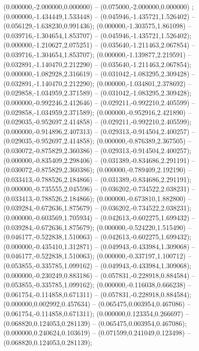  (0.000000,-2.000000,0.000000) -- (0.075000,-2.000000,0.000000) ;
 (0.000000,-1.434449,1.533448) -- (0.045946,-1.435721,1.526402) -- (0.056129,-1.638230,0.991436);
 (0.000000,-1.303575,1.861098) -- (0.039716,-1.304654,1.853707) -- (0.045946,-1.435721,1.526402);
 (0.000000,-1.210627,2.075251) -- (0.035640,-1.211463,2.067854) -- (0.039716,-1.304654,1.853707);
 (0.000000,-1.139877,2.219591) -- (0.032891,-1.140470,2.212290) -- (0.035640,-1.211463,2.067854);
 (0.000000,-1.082928,2.316619) -- (0.031042,-1.083295,2.309428) -- (0.032891,-1.140470,2.212290);
 (0.000000,-1.034801,2.378692) -- (0.029858,-1.034959,2.371589) -- (0.031042,-1.083295,2.309428);
 (0.000000,-0.992246,2.412646) -- (0.029211,-0.992210,2.405599) -- (0.029858,-1.034959,2.371589);
 (0.000000,-0.952916,2.421890) -- (0.029035,-0.952697,2.414858) -- (0.029211,-0.992210,2.405599);
 (0.000000,-0.914896,2.407313) -- (0.029313,-0.914504,2.400257) -- (0.029035,-0.952697,2.414858);
 (0.000000,-0.876389,2.367505) -- (0.030072,-0.875829,2.360386) -- (0.029313,-0.914504,2.400257);
 (0.000000,-0.835409,2.298406) -- (0.031389,-0.834686,2.291191) -- (0.030072,-0.875829,2.360386);
 (0.000000,-0.789409,2.192190) -- (0.033413,-0.788526,2.184866) -- (0.031389,-0.834686,2.291191);
 (0.000000,-0.735555,2.045596) -- (0.036202,-0.734522,2.038231) -- (0.033413,-0.788526,2.184866);
 (0.000000,-0.673810,1.882800) -- (0.039284,-0.672636,1.875679) -- (0.036202,-0.734522,2.038231);
 (0.000000,-0.603569,1.705934) -- (0.042613,-0.602275,1.699432) -- (0.039284,-0.672636,1.875679);
 (0.000000,-0.524220,1.515490) -- (0.046177,-0.522838,1.510063) -- (0.042613,-0.602275,1.699432);
 (0.000000,-0.435410,1.312871) -- (0.049943,-0.433984,1.309068) -- (0.046177,-0.522838,1.510063);
 (0.000000,-0.337197,1.100712) -- (0.053855,-0.335785,1.099162) -- (0.049943,-0.433984,1.309068);
 (0.000000,-0.230249,0.883186) -- (0.057831,-0.228918,0.884584) -- (0.053855,-0.335785,1.099162);
 (0.000000,-0.116038,0.666238) -- (0.061754,-0.114858,0.671311) -- (0.057831,-0.228918,0.884584);
 (0.000000,0.002992,0.457634) -- (0.065475,0.003954,0.467086) -- (0.061754,-0.114858,0.671311);
 (0.000000,0.123354,0.266697) -- (0.068820,0.124053,0.281139) -- (0.065475,0.003954,0.467086);
 (0.000000,0.240624,0.103619) -- (0.071599,0.241049,0.123498) -- (0.068820,0.124053,0.281139);
